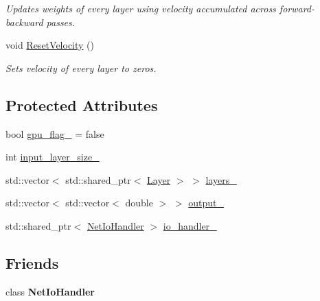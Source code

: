 \begin{DoxyCompactItemize}
\begin{DoxyCompactList}\small\item\em Updates weights of every layer using velocity accumulated across forward-\/backward passes. \end{DoxyCompactList}\item 
\mbox{\label{classneuralnet_1_1Net_a6fd85deb3c82bfe77ac7d6be2a539b9a}} 
void \hyperlink{classneuralnet_1_1Net_a6fd85deb3c82bfe77ac7d6be2a539b9a}{Reset\+Velocity} ()
\begin{DoxyCompactList}\small\item\em Sets velocity of every layer to zeros. \end{DoxyCompactList}\end{DoxyCompactItemize}
\subsection*{Protected Attributes}
\begin{DoxyCompactItemize}
\item 
bool \hyperlink{classneuralnet_1_1Net_aa84c702ce8abcb7b034348d94f919838}{gpu\+\_\+flag\+\_\+} = false
\item 
int \hyperlink{classneuralnet_1_1Net_ae229ac240ce45c28d36d82bfb9bc1049}{input\+\_\+layer\+\_\+size\+\_\+}
\item 
std\+::vector$<$ std\+::shared\+\_\+ptr$<$ \hyperlink{classneuralnet_1_1Layer}{Layer} $>$ $>$ \hyperlink{classneuralnet_1_1Net_a4aa4d82f8323fccb58eccb06a52bf0bf}{layers\+\_\+}
\item 
std\+::vector$<$ std\+::vector$<$ double $>$ $>$ \hyperlink{classneuralnet_1_1Net_a477cc97557f82094b4787b7ebddaaf7f}{output\+\_\+}
\item 
std\+::shared\+\_\+ptr$<$ \hyperlink{classneuralnet_1_1NetIoHandler}{Net\+Io\+Handler} $>$ \hyperlink{classneuralnet_1_1Net_a667dea73a52e84a82f7fff1da84cb9b7}{io\+\_\+handler\+\_\+}
\end{DoxyCompactItemize}
\subsection*{Friends}
\begin{DoxyCompactItemize}
\item 
\mbox{\label{classneuralnet_1_1Net_a7af2d148b6d7436ce8f92759bf09dbf3}} 
class {\bfseries Net\+Io\+Handler}
\end{DoxyCompactItemize}



